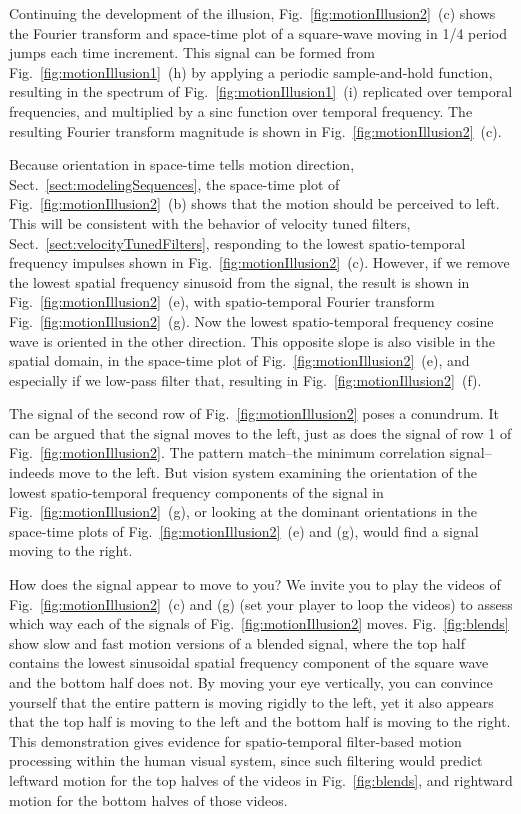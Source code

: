 Continuing the development of the illusion, Fig.~\ref{fig:motionIllusion2}~(c) shows the Fourier transform and space-time plot of a square-wave moving in 1/4 period jumps each time increment.  This signal can be formed from Fig.~\ref{fig:motionIllusion1}~(h) by applying a periodic sample-and-hold function, resulting in the spectrum of  Fig.~\ref{fig:motionIllusion1}~(i) replicated over temporal frequencies, and multiplied by a sinc function over temporal frequency.  The resulting Fourier transform magnitude is shown in Fig.~\ref{fig:motionIllusion2}~(c).  

Because orientation in space-time tells motion direction, Sect.~\ref{sect:modelingSequences}, the space-time plot of Fig.~\ref{fig:motionIllusion2}~(b) shows that the motion should be perceived to left.  This will be consistent with the behavior of velocity tuned filters, Sect.~\ref{sect:velocityTunedFilters}, responding to the lowest spatio-temporal frequency impulses shown in 
Fig.~\ref{fig:motionIllusion2}~(c). However, if we remove the lowest spatial frequency sinusoid from the signal, the result is shown in 
Fig.~\ref{fig:motionIllusion2}~(e), with spatio-temporal Fourier transform Fig.~\ref{fig:motionIllusion2}~(g).  Now the lowest spatio-temporal frequency cosine wave is oriented in the other direction.  This opposite slope is also visible in the spatial domain, in the space-time plot of Fig.~\ref{fig:motionIllusion2}~(e), and especially if we low-pass filter that, resulting in Fig.~\ref{fig:motionIllusion2}~(f).

The signal of the second row of Fig.~\ref{fig:motionIllusion2} poses a conundrum.  It can be argued that the signal moves to the left, just as does the signal of row 1 of Fig.~\ref{fig:motionIllusion2}.  The pattern match--the minimum correlation signal--indeeds move to the left.  But vision system examining the orientation of the lowest spatio-temporal frequency components of the signal in Fig.~\ref{fig:motionIllusion2}~(g), or looking at the dominant orientations in the space-time plots of 
 Fig.~\ref{fig:motionIllusion2}~(e) and (g), would find a signal moving to the right.
 
How does the signal appear to move to you?  We invite you to play the videos of Fig.~\ref{fig:motionIllusion2}~(c) and (g) (set your player to loop the videos) to assess which way each of the signals of  Fig.~\ref{fig:motionIllusion2} moves.   Fig.~\ref{fig:blends} show slow and fast motion versions of a blended signal, where the top half contains the lowest sinusoidal spatial frequency component of the square wave and the bottom half does not.  By moving your eye vertically, you can convince yourself that the entire pattern is moving rigidly to the left, yet it also appears that the top half is moving to the left and the bottom half is moving to the right.  This demonstration gives evidence for spatio-temporal filter-based motion processing within the human visual system, since such filtering would predict leftward motion for the top halves of the videos in Fig.~\ref{fig:blends}, and rightward motion for the bottom halves of those videos.

